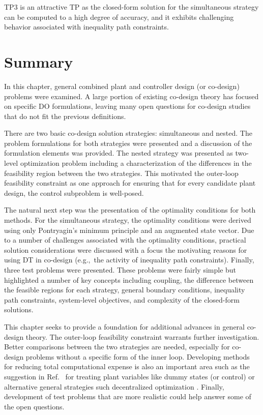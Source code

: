 TP3 is an attractive TP as the closed-form solution for the simultaneous strategy can be computed to a high degree of accuracy, and it exhibits challenging behavior associated with inequality path constraints.

\section{Summary \label{sec:ch3:conclusion}}

In this chapter, general combined plant and controller design (or co-design) problems were examined.
A large portion of existing co-design theory has focused on specific DO formulations, leaving many open questions for co-design studies that do not fit the previous definitions. 

There are two basic co-design solution strategies: simultaneous and nested.
The problem formulations for both strategies wer{}e presented and a discussion of the formulation elements was provided.
The nested strategy was presented as two-level optimization problem including a characterization of the differences in the feasibility region between the two strategies.
This motivated the outer-loop feasibility constraint as one approach for ensuring that for every candidate plant design, the control subproblem is well-posed.

The natural next step was the presentation of the optimality conditions for both methods.
For the simultaneous strategy, the optimality conditions were derived using only Pontryagin's minimum principle and an augmented state vector.
Due to a number of challenges associated with the optimality conditions, practical solution considerations were discussed with a focus the motivating reasons for using DT in co-design (e.g.,~the activity of inequality path constraints).
Finally, three test problems were presented.
These problems were fairly simple but highlighted a number of key concepts including coupling, the difference between the feasible regions for each strategy, general boundary conditions, inequality path constraints, system-level objectives, and complexity of the closed-form solutions.

This chapter seeks to provide a foundation for additional advances in general co-design theory. 
The outer-loop feasibility constraint warrants further investigation. 
Better comparisons between the two strategies are needed, especially for co-design problems without a specific form of the inner loop.
Developing methods for reducing total computational expense is also an important area such as the suggestion in Ref.~\cite{Kelly2015a} for treating plant variables like dummy states (or control) or alternative general strategies such decentralized optimization \cite{Allison2010b, Liu2017a}.
Finally, development of test problems that are more realistic could help answer some of the open questions.